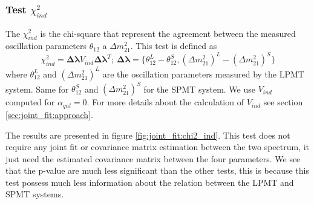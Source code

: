 \documentclass[../main.tex]{subfiles}
\begin{document}
\subsubsection{Test $\chi^2_{ind}$}

The $\chi^2_{ind}$ is the chi-square that represent the agreement between the measured oscillation parameters $\theta_{12}$ a $\Delta m^2_{21}$. This test is defined as
\begin{equation}
  \chi^2_{ind} = \bm{\Delta \lambda} V_{ind} \bm{\Delta \lambda}^T; ~ \bm{\Delta \lambda} = \{\theta_{12}^L - \theta_{12}^S, (\Delta m^2_{21})^L - (\Delta m^2_{21})^S\}
\end{equation}
where $\theta^L_{12}$ and $(\Delta m^2_{21})^L$ are the oscillation parameters measured by the LPMT system. Same for $\theta_{12}^S$ and $(\Delta m^2_{21})^S$ for the SPMT system. We use $V_{ind}$ computed for $\alpha_{qnl} = 0$. For more details about the calculation of $V_{ind}$ see section \ref{sec:joint_fit:approach}.

The results are presented in figure \ref{fig:joint_fit:chi2_ind}. This test does not require any joint fit or covariance matrix estimation between the two spectrum, it just need the estimated covariance matrix between the four parameters. We see that the p-value are much less significant than the other tests, this is because this test possess much less information about the relation between the LPMT and SPMT systems.
\end{document}

